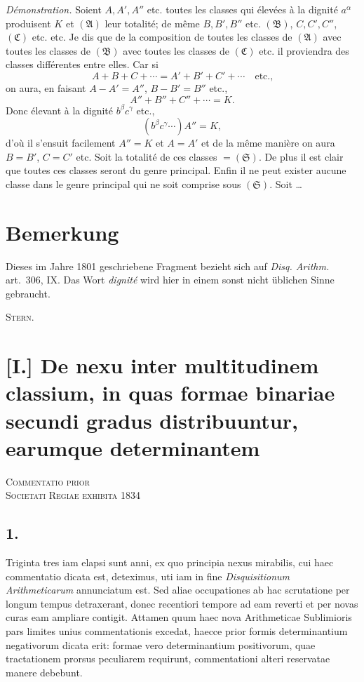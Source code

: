 \documentclass[12pt]{article}
\begin{document}
\emph{Démonstration.} Soient $A,A',A''$ etc. toutes les classes qui élevées à la dignité $a^\alpha$ produisent $K$ et $(\mathfrak A)$ leur totalité; de même $B,B',B''$ etc. $(\mathfrak B)$, $C,C',C''$, $(\mathfrak C)$ etc. etc. Je dis que de la composition de toutes les classes de $(\mathfrak A)$ avec toutes les classes de $(\mathfrak B)$ avec toutes les classes de $(\mathfrak C)$ etc. il proviendra des classes différentes entre elles. Car si
\[
A+B+C+\cdots=A'+B'+C'+\cdots \quad\text{etc.,}
\]
on aura, en faisant $A-A'=A''$, $B-B'=B''$ etc.,
\[
A''+B''+C''+\cdots=K.
\]
Donc élevant à la dignité $b^\beta c^\gamma$ etc.,
\[
(b^\beta c^\gamma\cdots)A''=K,
\]
d'où il s'ensuit facilement $A''=K$ et $A=A'$ et de la même manière on aura $B=B'$, $C=C'$ etc. Soit la totalité de ces classes $=(\mathfrak S)$. De plus il est clair que toutes ces classes seront du genre principal. Enfin il ne peut exister aucune classe dans le genre principal qui ne soit comprise sous $(\mathfrak S)$. Soit \ldots

\section*{Bemerkung}

Dieses im Jahre 1801 geschriebene Fragment bezieht sich auf \emph{Disq. Arithm.} art.~306, IX. Das Wort \emph{dignité} wird hier in einem sonst nicht üblichen Sinne gebraucht.

\begin{flushright}
\textsc{Stern}.
\end{flushright}



\section*{[I.] De nexu inter multitudinem classium, in quas formae binariae secundi gradus distribuuntur, earumque determinantem}

\begin{center}
\textsc{Commentatio prior}\\
\textsc{Societati Regiae exhibita 1834}
\end{center}

\subsection*{1.}

Triginta tres iam elapsi sunt anni, ex quo principia nexus mirabilis, cui haec commentatio dicata est, deteximus, uti iam in fine \emph{Disquisitionum Arithmeticarum} annunciatum est. Sed aliae occupationes ab hac scrutatione per longum tempus detraxerant, donec recentiori tempore ad eam reverti et per novas curas eam ampliare contigit. Attamen quum haec nova Arithmeticae Sublimioris pars limites unius commentationis excedat, haecce prior formis determinantium negativorum dicata erit: formae vero determinantium positivorum, quae tractationem prorsus peculiarem requirunt, commentationi alteri reservatae manere debebunt.
\end{document}
